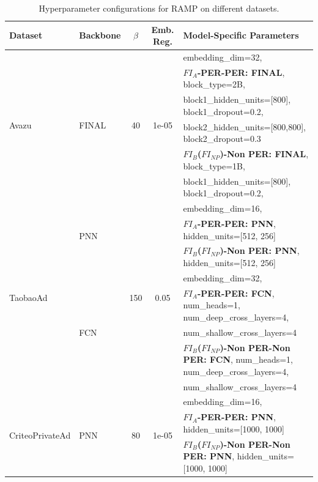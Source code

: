 \begin{table}[t]
    \centering
    \small
    \caption{Hyperparameter configurations for RAMP on different datasets.}
    \label{tab:model_hyperparams}
    \begin{tabular}{l|l|c|c|l}
    \hline
    \textbf{Dataset} & \textbf{Backbone} & \textbf{$\beta$} & \textbf{Emb. Reg.} & \textbf{Model-Specific Parameters} \\
    \hline
    \multirow{6}{*}{Avazu} & \multirow{6}{*}{FINAL} & \multirow{6}{*}{40} & \multirow{6}{*}{1e-05} &  embedding\_dim=32, \\
    & & & & \textbf{$FI_A$-PER-PER: FINAL}, block\_type=2B,  \\
    & & & & block1\_hidden\_units=[800], block1\_dropout=0.2, \\
    & & & & block2\_hidden\_units=[800,800], block2\_dropout=0.3 \\
    & & & & \textbf{$FI_B$($FI_{NP}$)-Non PER: FINAL}, block\_type=1B, \\
    & & & & block1\_hidden\_units=[800], block1\_dropout=0.2, \\
    \hline
    \multirow{8}{*}{TaobaoAd} & \multirow{3}{*}{PNN} & \multirow{8}{*}{150} & \multirow{8}{*}{0.05} & embedding\_dim=16, \\
    & & & & \textbf{$FI_A$-PER-PER: PNN}, hidden\_units=[512, 256] \\
    & & & & \textbf{$FI_B$($FI_{NP}$)-Non PER: PNN}, hidden\_units=[512, 256] \\
    \cline{2-2}\cline{5-5}
    & \multirow{5}{*}{FCN} & & & embedding\_dim=32,  \\
    & & & & \textbf{$FI_A$-PER-PER: FCN}, num\_heads=1, num\_deep\_cross\_layers=4, \\
    & & & & num\_shallow\_cross\_layers=4 \\
    & & & & \textbf{$FI_B$($FI_{NP}$)-Non PER-Non PER: FCN}, num\_heads=1, num\_deep\_cross\_layers=4, \\
    & & & & num\_shallow\_cross\_layers=4 \\
    \hline
    \multirow{3}{*}{CriteoPrivateAd} & \multirow{3}{*}{PNN} & \multirow{3}{*}{80} & \multirow{3}{*}{1e-05} & embedding\_dim=16, \\
    & & & & \textbf{$FI_A$-PER-PER: PNN}, hidden\_units=[1000, 1000] \\
    & & & & \textbf{$FI_B$($FI_{NP}$)-Non PER-Non PER: PNN}, hidden\_units=[1000, 1000] \\
    \hline
    \end{tabular}
\end{table}

